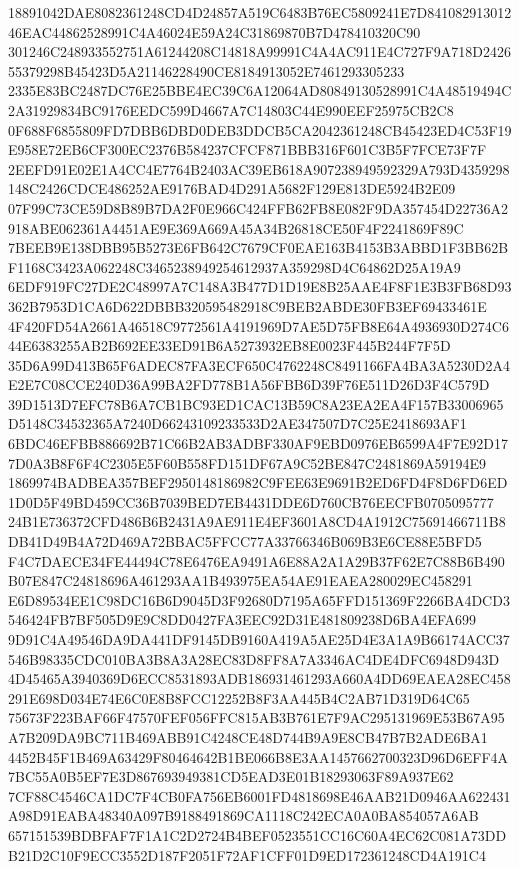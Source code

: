 \documentclass[UTF8,fontset=fandol,zihao=-4,a4paper]{ctexart}
\begin{document}
{{18891042DAE8082361248CD4D24857A519C6483B76EC5809241E7D84108291301246EAC44862528991C4A46024E59A24C31869870B7D478410320C90
301246C248933552751A61244208C14818A99991C4A4AC911E4C727F9A718D242655379298B45423D5A21146228490CE8184913052E7461293305233
2335E83BC2487DC76E25BBE4EC39C6A12064AD80849130528991C4A48519494C2A31929834BC9176EEDC599D4667A7C14803C44E990EEF25975CB2C8
0F688F6855809FD7DBB6DBD0DEB3DDCB5CA2042361248CB45423ED4C53F19E958E72EB6CF300EC2376B584237CFCF871BBB316F601C3B5F7FCE73F7F
2EEFD91E02E1A4CC4E7764B2403AC39EB618A907238949592329A793D4359298148C2426CDCE486252AE9176BAD4D291A5682F129E813DE5924B2E09
07F99C73CE59D8B89B7DA2F0E966C424FFB62FB8E082F9DA357454D22736A2918ABE062361A4451AE9E369A669A45A34B26818CE50F4F2241869F89C
7BEEB9E138DBB95B5273E6FB642C7679CF0EAE163B4153B3ABBD1F3BB62BF1168C3423A062248C3465238949254612937A359298D4C64862D25A19A9
6EDF919FC27DE2C48997A7C148A3B477D1D19E8B25AAE4F8F1E3B3FB68D93362B7953D1CA6D622DBBB320595482918C9BEB2ABDE30FB3EF69433461E
4F420FD54A2661A46518C9772561A4191969D7AE5D75FB8E64A4936930D274C644E6383255AB2B692EE33ED91B6A5273932EB8E0023F445B244F7F5D
35D6A99D413B65F6ADEC87FA3ECF650C4762248C8491166FA4BA3A5230D2A4E2E7C08CCE240D36A99BA2FD778B1A56FBB6D39F76E511D26D3F4C579D
39D1513D7EFC78B6A7CB1BC93ED1CAC13B59C8A23EA2EA4F157B33006965D5148C34532365A7240D66243109233533D2AE347507D7C25E2418693AF1
6BDC46EFBB886692B71C66B2AB3ADBF330AF9EBD0976EB6599A4F7E92D177D0A3B8F6F4C2305E5F60B558FD151DF67A9C52BE847C2481869A59194E9
1869974BADBEA357BEF2950148186982C9FEE63E9691B2ED6FD4F8D6FD6ED1D0D5F49BD459CC36B7039BED7EB4431DDE6D760CB76EECFB0705095777
24B1E736372CFD486B6B2431A9AE911E4EF3601A8CD4A1912C75691466711B8DB41D49B4A72D469A72BBAC5FFCC77A33766346B069B3E6CE88E5BFD5
F4C7DAECE34FE44494C78E6476EA9491A6E88A2A1A29B37F62E7C88B6B490B07E847C24818696A461293AA1B493975EA54AE91EAEA280029EC458291
E6D89534EE1C98DC16B6D9045D3F92680D7195A65FFD151369F2266BA4DCD3546424FB7BF505D9E9C8DD0427FA3EEC92D31E481809238D6BA4EFA699
9D91C4A49546DA9DA441DF9145DB9160A419A5AE25D4E3A1A9B66174ACC37546B98335CDC010BA3B8A3A28EC83D8FF8A7A3346AC4DE4DFC6948D943D
4D45465A3940369D6ECC8531893ADB186931461293A660A4DD69EAEA28EC458291E698D034E74E6C0E8B8FCC12252B8F3AA445B4C2AB71D319D64C65
75673F223BAF66F47570FEF056FFC815AB3B761E7F9AC295131969E53B67A95A7B209DA9BC711B469ABB91C4248CE48D744B9A9E8CB47B7B2ADE6BA1
4452B45F1B469A63429F80464642B1BE066B8E3AA1457662700323D96D6EFF4A7BC55A0B5EF7E3D867693949381CD5EAD3E01B18293063F89A937E62
7CF88C4546CA1DC7F4CB0FA756EB6001FD4818698E46AAB21D0946AA622431A98D91EABA48340A097B9188491869CA1118C242ECA0A0BA854057A6AB
657151539BDBFAF7F1A1C2D2724B4BEF0523551CC16C60A4EC62C081A73DDB21D2C10F9ECC3552D187F2051F72AF1CFF01D9ED172361248CD4A191C4
}}
\end{document}

